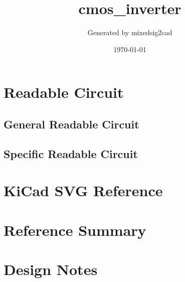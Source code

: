 \documentclass[11pt]{article}
\title{cmos\_inverter}
\author{Generated by mixedsig2cad}
\date{\today}
\begin{document}
\maketitle
\section{Readable Circuit}
\subsection{General Readable Circuit}

\subsection{Specific Readable Circuit}

\section{KiCad SVG Reference}
\section{Reference Summary}

\section{Design Notes}

\end{document}
